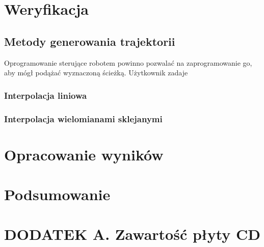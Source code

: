 \documentclass[a4paper, 12pt, twoside]{article}
\begin{document}

\newpage
\vspace*{1.5 cm}
\section{Weryfikacja}
\vspace{1.5 cm}
\subsection{Metody generowania trajektorii}

Oprogramowanie sterujące robotem powinno pozwalać na zaprogramowanie go, aby mógł podążać wyznaczoną ścieżką. Użytkownik zadaje 
\subsubsection{Interpolacja liniowa}
\subsubsection{Interpolacja wielomianami sklejanymi}


\newpage
\vspace*{1.5 cm}
\section{Opracowanie wyników}  \label{wyniki}
\vspace{3.0 cm}
\vspace{1.0 cm}

\newpage
\vspace*{1.5 cm}
\section{Podsumowanie}
\vspace{3.0 cm}

\newpage
\section*{DODATEK A. Zawartość płyty CD}
\vspace{3.0 cm}

\newpage
\section*{}
\printbibliography
\end{document}
